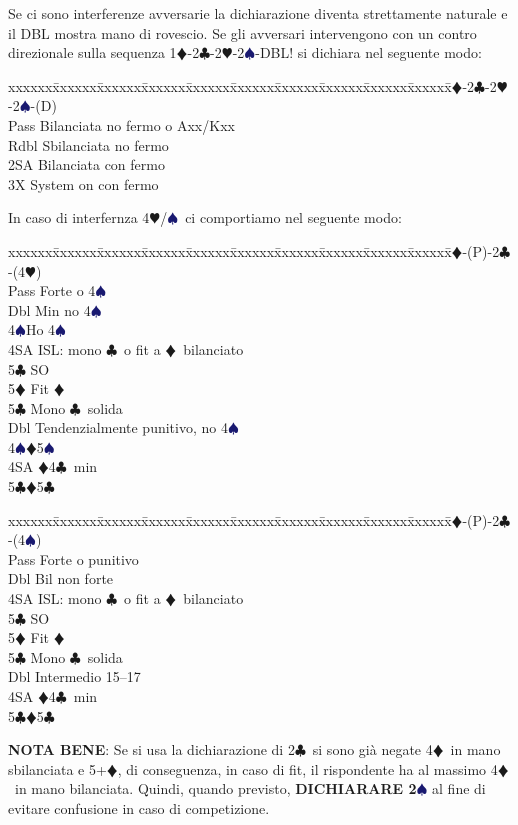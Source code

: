 \documentclass[a4paper,italian]{article}
\newcommand{\BC}{\textcolor{OliveGreen}{$\clubsuit$}}
\newcommand{\BD}{\textcolor{RedOrange}{$\vardiamondsuit$}}
\newcommand{\BH}{\textcolor{Red2}{$\varheartsuit${}}}
\newcommand{\BS}{\textcolor{MidnightBlue}{$\spadesuit${}}}
\newenvironment{bidtable}
{\begin{tabbing}

    xxxxxx\=xxxxxx\=xxxxxx\=xxxxxx\=xxxxxx\=xxxxxx\=xxxxxx\=xxxxxx\=xxxxxx\=xxxxxx\=\kill}
{\end{tabbing} }%
\newenvironment{attenzione}[1]
{\begin{tcolorbox}[colframe=red!80!white,title=#1]}
    {
\end{tcolorbox} }%
\begin{document}
\bigbreak
\begin{attenzione}{Interferenze}
    Se ci sono interferenze avversarie la dichiarazione diventa strettamente naturale e il DBL mostra mano di rovescio. Se gli avversari intervengono con un contro direzionale sulla sequenza 1\BD -2\BC -2\BH -2\BS -DBL! si dichiara nel seguente modo:
    \bigbreak
    \begin{bidtable}
        1\BD-2\BC-2\BH-2\BS-(D)\+\\
        Pass \> Bilanciata no fermo o Axx/Kxx\\
        Rdbl \> Sbilanciata no fermo\\
        2SA \> Bilanciata con fermo\\
        3X \> System on con fermo\-
    \end{bidtable}
    \smallbreak
    In caso di interfernza 4\BH /\BS\ ci comportiamo nel seguente modo:
    \smallbreak
    \begin{bidtable}
        1\BD-(P)-2\BC-(4\BH)\+\\
        Pass \> Forte o 4\BS\+\\
        Dbl\> Min no 4\BS\\
        4\BS\>Ho 4\BS\\
        4SA \>ISL: mono \BC\ o fit a \BD\ bilanciato\+\\
        5\BC\> SO\+\\
        5\BD\> Fit \BD\-\-\\
        5\BC\> Mono \BC\ solida\-\\
        Dbl \> Tendenzialmente punitivo, no 4\BS \\
        4\BS {}\BD 5\BS \\
        4SA \BD4\BC\ min\\
        5\BC {}\BD5\BC
    \end{bidtable}
    \smallbreak
    \begin{bidtable}
        1\BD-(P)-2\BC-(4\BS)\+\\
        Pass \> Forte o punitivo\+\\
        Dbl\> Bil non forte\\
        4SA\> ISL: mono \BC\ o fit a \BD\ bilanciato\+\\
        5\BC\> SO\+\\
        5\BD\> Fit \BD\-\-\\
        5\BC\> Mono \BC\ solida\-\\
        Dbl \> Intermedio 15--17\\
        4SA \BD4\BC\ min\\
        5\BC {}\BD5\BC\\
    \end{bidtable}

    \textbf{NOTA BENE}: Se si usa la dichiarazione di 2\BC\ si sono già negate 4\BD\ in mano sbilanciata e 5+\BD, di conseguenza, in caso di fit, il rispondente ha al massimo 4\BD\ in mano bilanciata. Quindi, quando previsto, \textbf{DICHIARARE 2\BS} al fine di evitare confusione in caso di competizione.
\end{attenzione}
\end{document}
